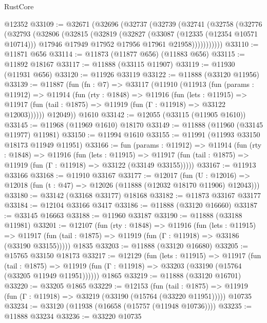 \begin{lexlean}{RustCore}
\begin{coremodule}
    @12352
@33109 := @32671
    (@32696
      (@32737
        (@32739
          (@32741
            (@32758
              (@32776
                (@32793
                  (@32806
                    (@32815
                      (@32819
                        (@32827
                          (@33087 (@12335 (@12354 @10571 @10714)))
                          @17946
                          @17949
                          @17952
                          @17956
                          @17961
                          @21958)))))))))))
@33110 := @11871 @656
@33114 := @11873 (@11877 @656) (@11883 @656)
@33115 := @11892 @18167
@33117 := @11888 (@33115 @11907)
@33119 := @11930 (@11931 @656)
@33120 := @11926 @33119
@33122 := @11888 (@33120 @11956)
@33139 := @11887
    (fun (fn : @7) =>
    @33117
      (@11910
        (@11913
          (fun (params : @11912) =>
          @11914
            (fun (rty : @1848) =>
            @11916
              (fun (lets : @11915) =>
              @11917 (fun (tail : @1875) => @11919 (fun (Γ : @11918) => @33122 @12003))))))
        @12049))
    @1610
@33142 := @12055 (@33115 (@11905 @1610))
@33145 := @11968 (@11969 @1610) @18170
@33149 := @11888 (@11960 (@33145 @11977) @11981)
@33150 := @11994 @1610
@33155 := @11991 (@11993 @33150 @18173 @11949 @11951)
@33166 := fun (params : @11912) =>
  @11914
    (fun (rty : @1848) =>
    @11916
      (fun (lets : @11915) =>
      @11917 (fun (tail : @1875) => @11919 (fun (Γ : @11918) => @33122 (@33149 @33155)))))
@33167 := @11913 @33166
@33168 := @11910 @33167
@33177 := @12017
    (fun (U : @12016) => @12018 (fun (t : @47) => @12026 (@11888 (@12032 @18170 @11906) @12043)))
@33180 := @33142 (@33168 @33177) @18168
@33182 := @11873 @33167 @33177
@33184 := @12104 @33166 @3417
@33186 := @11888 (@33120 @16660)
@33187 := @33145 @16663
@33188 := @11960 @33187
@33190 := @11888 (@33188 @11981)
@33201 := @12107
    (fun (rty : @1848) =>
    @11916
      (fun (lets : @11915) =>
      @11917 (fun (tail : @1875) => @11919 (fun (Γ : @11918) => @33186 (@33190 @33155)))))
    @1835
@33203 := @11888 (@33120 @16680)
@33205 := @15765 @33150 @18173
@33217 := @12129
    (fun (lets : @11915) =>
    @11917
      (fun (tail : @1875) =>
      @11919 (fun (Γ : @11918) => @33203 (@33190 (@15764 (@33205 @11949 @11951))))))
    @1865
@33219 := @11888 (@33120 @16701)
@33220 := @33205 @1865
@33229 := @12153
    (fun (tail : @1875) => @11919 (fun (Γ : @11918) => @33219 (@33190 (@15764 (@33220 @11951)))))
    @10735
@33234 := @33120 (@11938 (@16658 (@15757 (@11948 @10736))))
@33235 := @11888 @33234
@33236 := @33220 @10735

\end{coremodule}
\end{lexlean}

